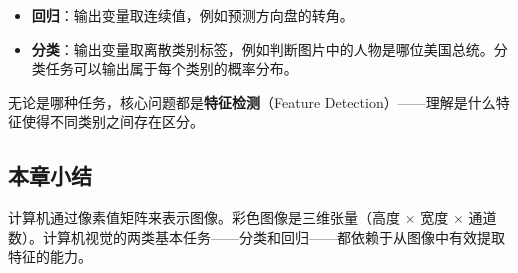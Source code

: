 \begin{itemize}
    \item \textbf{回归}：输出变量取连续值，例如预测方向盘的转角。
    \item \textbf{分类}：输出变量取离散类别标签，例如判断图片中的人物是哪位美国总统。分类任务可以输出属于每个类别的概率分布。
\end{itemize}

无论是哪种任务，核心问题都是\textbf{特征检测}（Feature Detection）——理解是什么特征使得不同类别之间存在区分。

\subsection{本章小结}

计算机通过像素值矩阵来表示图像。彩色图像是三维张量（高度 $\times$ 宽度 $\times$ 通道数）。计算机视觉的两类基本任务——分类和回归——都依赖于从图像中有效提取特征的能力。

\newpage
